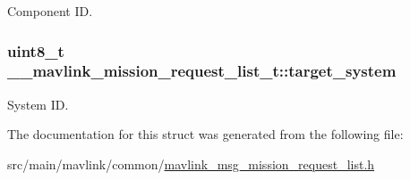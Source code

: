 Component I\+D. 

\hypertarget{struct____mavlink__mission__request__list__t_ae8b0c8bffa1ecde59f37cdf8b65f47d4}{
\subsubsection[{target\+\_\+system}]{\setlength{\rightskip}{0pt plus 5cm}uint8\+\_\+t \+\_\+\+\_\+mavlink\+\_\+mission\+\_\+request\+\_\+list\+\_\+t\+::target\+\_\+system}}\label{struct____mavlink__mission__request__list__t_ae8b0c8bffa1ecde59f37cdf8b65f47d4}


System I\+D. 



The documentation for this struct was generated from the following file\+:\begin{DoxyCompactItemize}
\item 
src/main/mavlink/common/\hyperlink{mavlink__msg__mission__request__list_8h}{mavlink\+\_\+msg\+\_\+mission\+\_\+request\+\_\+list.\+h}\end{DoxyCompactItemize}
